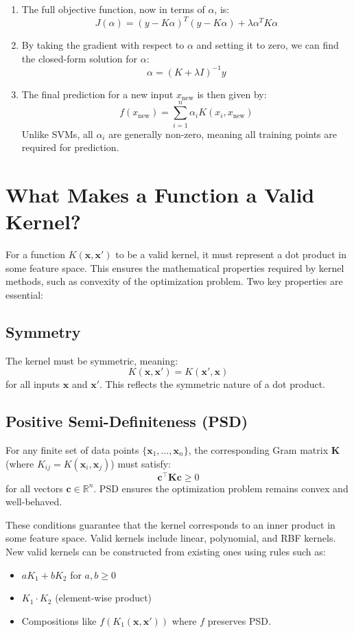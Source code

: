 \documentclass{article}
\begin{document}
\begin{multicols}{2}
\begin{enumerate}
		\item The full objective function, now in terms of $\alpha$, is:
		      \[
			      J(\alpha) = (y - K\alpha)^T (y - K\alpha) + \lambda \alpha^T K \alpha
		      \]

		\item By taking the gradient with respect to $\alpha$ and setting it to zero, we can find the closed-form solution for $\alpha$:
		      \[
			      \alpha = (K+\lambda I)^{-1}y
		      \]

		\item The final prediction for a new input $x_{\text{new}}$ is then given by:
		      \[
			      f(x_{\text{new}}) = \sum_{i=1}^n \alpha_i K(x_i, x_{\text{new}})
		      \]
		      Unlike SVMs, all $\alpha_i$ are generally non-zero, meaning all training points are required for prediction.
	\end{enumerate}

	\section{What Makes a Function a Valid Kernel?}
	For a function $K(\mathbf{x}, \mathbf{x}')$ to be a valid kernel, it must represent a dot product in some feature space. This ensures the mathematical properties required by kernel methods, such as convexity of the optimization problem. Two key properties are essential:

	\subsection{Symmetry}
	The kernel must be symmetric, meaning:
	$$
		K(\mathbf{x}, \mathbf{x}') = K(\mathbf{x}', \mathbf{x})
	$$
	for all inputs $\mathbf{x}$ and $\mathbf{x}'$. This reflects the symmetric nature of a dot product.

	\subsection{Positive Semi-Definiteness (PSD)}
	For any finite set of data points $\{\mathbf{x}_1, \dots, \mathbf{x}_n\}$, the corresponding Gram matrix $\mathbf{K}$ (where $K_{ij} = K(\mathbf{x}_i, \mathbf{x}_j)$) must satisfy:
	$$
		\mathbf{c}^{\top}\mathbf{K}\mathbf{c} \ge 0
	$$
	for all vectors $\mathbf{c} \in \mathbb{R}^n$. PSD ensures the optimization problem remains convex and well-behaved.

	These conditions guarantee that the kernel corresponds to an inner product in some feature space. Valid kernels include linear, polynomial, and RBF kernels. New valid kernels can be constructed from existing ones using rules such as:
	\begin{itemize}
		\item $aK_1 + bK_2$ for $a, b \ge 0$
		\item $K_1 \cdot K_2$ (element-wise product)
		\item Compositions like $f(K_1(\mathbf{x}, \mathbf{x}'))$ where $f$ preserves PSD.
	\end{itemize}


\end{multicols}
\end{document}
